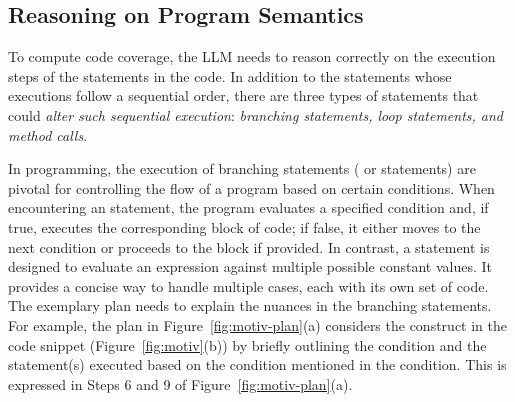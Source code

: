 \subsection{Reasoning on Program Semantics}\label{subsec:statement-types-1}
To compute code coverage, the LLM needs to reason correctly on the execution steps of the statements in the code. In addition to the statements whose executions follow a sequential order, there are three types of statements that could {\em alter such  sequential execution}: {\em branching statements, loop statements, and method calls}.

In programming, the execution of branching statements ( or  statements) are pivotal for controlling the flow of a program based on certain conditions. When encountering an  statement, the program evaluates a specified condition and, if true, executes the corresponding block of code; if false, it either moves to the next  condition or proceeds to the  block if provided.
In contrast, a  statement is designed to evaluate an expression against multiple possible constant values. It provides a concise way to handle multiple cases, each with its own set of code. The exemplary plan needs to explain the nuances in the branching statements.  For example, the plan in Figure~\ref{fig:motiv-plan}(a) considers the  construct in the code snippet (Figure~\ref{fig:motiv}(b)) by briefly outlining the condition and the statement(s) executed based on the condition mentioned in the condition. This is expressed in Steps 6 and 9 of Figure~\ref{fig:motiv-plan}(a).



